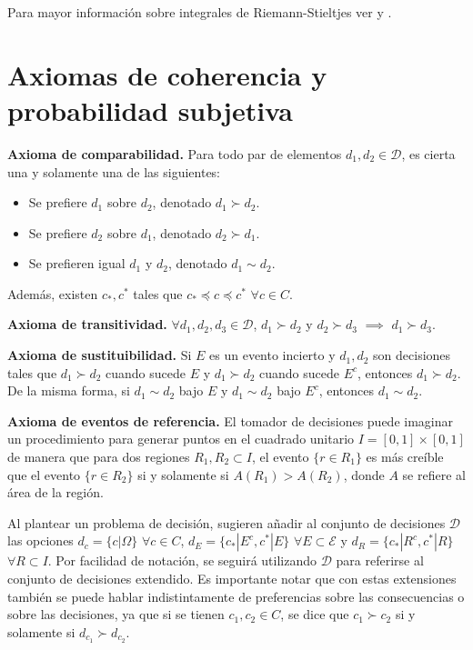 \documentclass[11pt,a4paper]{article}
\begin{document}
\begin{appendices}
Para mayor información sobre integrales de Riemann-Stieltjes ver \citet{rudin} y \citet{bartle}.

\newpage

\section{Axiomas de coherencia y probabilidad subjetiva} \label{ap:bayes}

\textbf{Axioma de comparabilidad.} Para todo par de elementos $d_1, d_2 \in \mathcal{D}$, es cierta una y solamente una de las siguientes:
\begin{itemize}
\item Se prefiere $d_1$ sobre $d_2$, denotado $d_1 \succ d_2$.
\item  Se prefiere $d_2$ sobre $d_1$, denotado $d_2 \succ d_1$.
\item Se prefieren igual $d_1$ y $d_2$, denotado $d_1 \sim d_2$.
\end{itemize}
Además, existen $c_*, c^*$ tales que $c_* \preceq c \preceq c^*$ $\forall c \in C$.

\textbf{Axioma de transitividad.} $\forall d_1, d_2, d_3 \in \mathcal{D}$, $d_1 \succ d_2$ y $d_2 \succ d_3$ $\implies$ $d_1 \succ d_3$.

\textbf{Axioma de sustituibilidad.} Si $E$ es un evento incierto y $d_1, d_2$ son decisiones tales que $d_1 \succ d_2$ cuando sucede $E$ y $d_1 \succ d_2$ cuando sucede $E^c$, entonces $d_1 \succ d_2$. De la misma forma, si $d_1 \sim d_2$ bajo $E$ y $d_1 \sim d_2$ bajo $E^c$, entonces $d_1 \sim d_2$.

\textbf{Axioma de eventos de referencia.} El tomador de decisiones puede imaginar un procedimiento para generar puntos en el cuadrado unitario $I = [0, 1] \times [0, 1]$ de manera que para dos regiones $R_1, R_2 \subset I$, el evento $\lbrace r \in R_1\rbrace$ es más creíble que el evento $\lbrace r \in R_2 \rbrace$ si y solamente si $A(R_1) > A(R_2)$, donde $A$ se refiere al área de la región.

Al plantear un problema de decisión, \citet{mendoza} sugieren añadir al conjunto de decisiones $\mathcal{D}$ las opciones $d_c = \lbrace c|\Omega\rbrace$ $\forall c \in C$, $d_E = \lbrace c_* | E^c, c^* | E \rbrace$ $\forall E \subset \mathcal{E}$ y $d_R = \lbrace c_*|R^c, c^* | R\rbrace$ $\forall R \subset I$.  Por facilidad de notación, se seguirá utilizando $\mathcal{D}$ para referirse al conjunto de decisiones extendido. Es importante notar que con estas extensiones también se puede hablar indistintamente de preferencias sobre las consecuencias o sobre las decisiones, ya que si se tienen $c_1, c_2 \in C$, se dice que $c_1 \succ c_2$ si y solamente si $d_{c_1} \succ d_{c_2}$.


\end{appendices}
\end{document}
